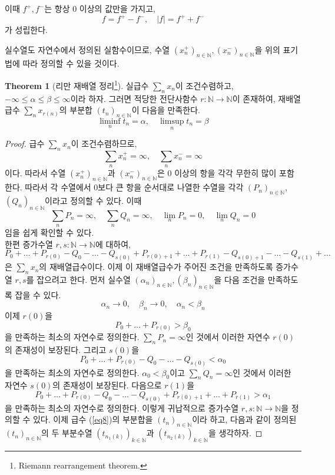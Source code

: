 \documentclass[11pt]{book}
\numberwithin{equation}{chapter}
\def\NN{\mathbb{N}}
\newcommand{\abs}[1]{\left\vert#1\right\vert}
\theoremstyle{definition}
\newtheorem{thm}{Theorem}[section]
\begin{document}
이때 \(f^+, f^-\)는 항상 0 이상의 값만을 가지고,
\[
f = f^+ - f^-, \quad \abs{f} = f^+ + f^-    
\]
가 성립한다.

실수열도 자연수에서 정의된 실함수이므로, 수열 \((x_n^+)_{n \in \NN}, (x_n^-)_{n \in \NN}\)을 위의 표기법에 따라 정의할 수 있을 것이다.

\begin{thm}[리만 재배열 정리\footnote{Riemann rearrangement theorem.}]
    실급수 \(\sum_n x_n\)이 조건수렴하고, \(- \infty \le \alpha \le \beta \le \infty\)이라 하자. 그러면 적당한 전단사함수 \(r: \NN \to \NN\)이 존재하여, 재배열급수 \(\sum_n x_{r(n)}\)의 부분합 \((t_n)_{n \in \NN}\)이 다음을 만족한다.
    \[
        \liminf_n t_n = \alpha, \quad \limsup_n t_n = \beta
    \]
\end{thm}
\begin{proof}
    급수 \(\sum_n x_n\)이 조건수렴하므로,
    \[
    \sum_n x_n^+ = \infty, \quad \sum_n x_n^- = \infty    
    \]
    이다. 따라서 수열 \((x_n^+)_{n \in \NN}\)과 \((x_n^-)_{n \in \NN}\)은 0 이상의 항을 각각 무한히 많이 포함한다. 따라서 각 수열에서 0보다 큰 항을 순서대로 나열한 수열을 각각 \((P_n)_{n \in \NN}\), \((Q_n)_{n \in \NN}\)이라고 정의할 수 있다. 이때
    \[
    \sum_n P_n = \infty, \quad \sum_n Q_n = \infty, \quad \lim_n P_n = 0, \quad \lim_n Q_n = 0
    \]
    임을 쉽게 확인할 수 있다.\\
    한편 증가수열 \(r, s : \NN \to \NN\)에 대하여,
    \begin{equation} \label{eq8}
        P_0 + \ldots + P_{r(0)} - Q_0 - \ldots - Q_{s(0)} + P_{r(0)+1} + \ldots + P_{r(1)} - Q_{s(0)+1} - \ldots - Q_{s(1)} + \ldots
    \end{equation}
    은 \(\sum_n x_n\)의 재배열급수이다. 이제 이 재배열급수가 주어진 조건을 만족하도록 증가수열 \(r, s\)를 잡으려고 한다. 먼저 실수열 \((\alpha_n)_{n \in \NN}, (\beta_n)_{n \in \NN}\)을 다음 조건을 만족하도록 잡을 수 있다.
    \[
    \alpha_n \to 0, \quad \beta_n \to 0, \quad \alpha_n < \beta_n
    \]
    이제 \(r(0)\)을
    \[
        P_0 + \ldots + P_{r(0)} > \beta_0    
    \]
    을 만족하는 최소의 자연수로 정의한다. \(\sum_n P_n = \infty\)인 것에서 이러한 자연수 \(r(0)\)의 존재성이 보장된다. 그리고 \(s(0)\)을
    \[
        P_0 + \ldots + P_{r(0)} - Q_0 - \ldots - Q_{s(0)} < \alpha_0
    \]
    을 만족하는 최소의 자연수로 정의한다. \(\alpha_0 < \beta_0\)이고 \(\sum_n Q_n = \infty\)인 것에서 이러한 자연수 \(s(0)\)의 존재성이 보장된다. 다음으로 \(r(1)\)을
    \[
        P_0 + \ldots + P_{r(0)} - Q_0 - \ldots - Q_{s(0)} + P_{r(0)+1} + \ldots + P_{r(1)} > \alpha_1
    \]
    을 만족하는 최소의 자연수로 정의한다. 이렇게 귀납적으로 증가수열 \(r, s : \NN \to \NN\)을 정의할 수 있다. 이제 급수 (\ref{eq8})의 부분합을 \((t_n)_{n \in \NN}\)이라 하고, 다음과 같이 정의된 \((t_n)_{n \in \NN}\)의 두 부분수열 \((t_{n_1(k)})_{k \in \NN}\)과 \((t_{n_2(k)})_{k \in \NN}\)을 생각하자.

\end{proof}
\end{document}
